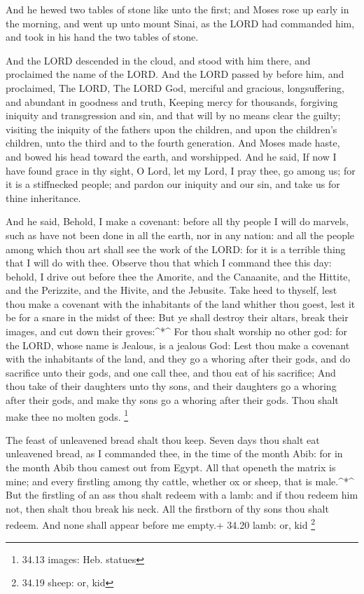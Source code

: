  And he hewed two tables of stone like unto the first; and
Moses rose up early in the morning, and went up unto mount Sinai, as the
LORD had commanded him, and took in his hand the two tables of stone.

 And the LORD descended in the cloud, and stood with him
there, and proclaimed the name of the LORD.  And the LORD
passed by before him, and proclaimed, The LORD, The LORD God, merciful
and gracious, longsuffering, and abundant in goodness and truth,
 Keeping mercy for thousands, forgiving iniquity and
transgression and sin, and that will by no means clear the guilty;
visiting the iniquity of the fathers upon the children, and upon the
children's children, unto the third and to the fourth generation.
 And Moses made haste, and bowed his head toward the earth,
and worshipped.  And he said, If now I have found grace in
thy sight, O Lord, let my Lord, I pray thee, go among us; for it is a
stiffnecked people; and pardon our iniquity and our sin, and take us for
thine inheritance.

 And he said, Behold, I make a covenant: before all thy
people I will do marvels, such as have not been done in all the earth,
nor in any nation: and all the people among which thou art shall see the
work of the LORD: for it is a terrible thing that I will do with thee.
 Observe thou that which I command thee this day: behold, I
drive out before thee the Amorite, and the Canaanite, and the Hittite,
and the Perizzite, and the Hivite, and the Jebusite.  Take
heed to thyself, lest thou make a covenant with the inhabitants of the
land whither thou goest, lest it be for a snare in the midst of thee:
 But ye shall destroy their altars, break their images, and
cut down their groves:\^{}*\^{}  For thou shalt worship no
other god: for the LORD, whose name is Jealous, is a jealous God:
 Lest thou make a covenant with the inhabitants of the
land, and they go a whoring after their gods, and do sacrifice unto
their gods, and one call thee, and thou eat of his sacrifice;
 And thou take of their daughters unto thy sons, and their
daughters go a whoring after their gods, and make thy sons go a whoring
after their gods.  Thou shalt make thee no molten gods.
\footnote{34.13 images: Heb. statues}

 The feast of unleavened bread shalt thou keep. Seven days
thou shalt eat unleavened bread, as I commanded thee, in the time of the
month Abib: for in the month Abib thou camest out from Egypt.
 All that openeth the matrix is mine; and every firstling
among thy cattle, whether ox or sheep, that is male.\^{}*\^{}
 But the firstling of an ass thou shalt redeem with a lamb:
and if thou redeem him not, then shalt thou break his neck. All the
firstborn of thy sons thou shalt redeem. And none shall appear before me
empty.+ 34.20 lamb: or, kid \footnote{34.19 sheep: or, kid}


